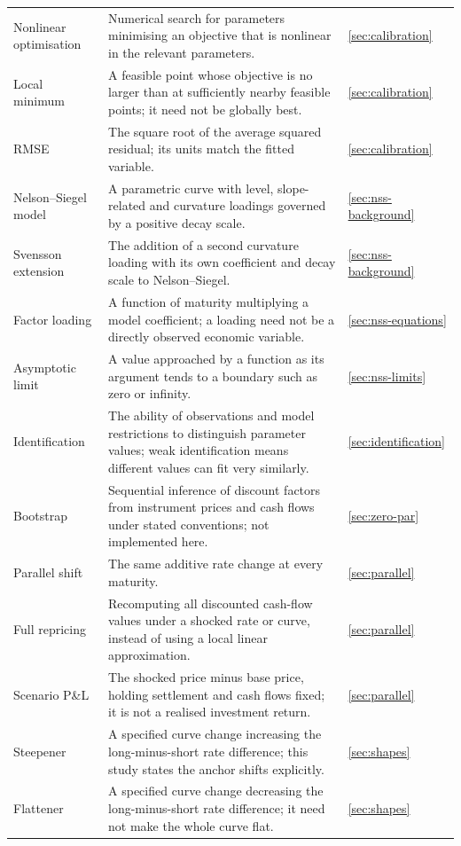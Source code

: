 \begin{longtable}{@{}L{0.22\textwidth}L{0.58\textwidth}L{0.12\textwidth}@{}}
Nonlinear optimisation & Numerical search for parameters minimising an objective that is nonlinear in the relevant parameters. & \ref{sec:calibration}\\
Local minimum & A feasible point whose objective is no larger than at sufficiently nearby feasible points; it need not be globally best. & \ref{sec:calibration}\\
RMSE & The square root of the average squared residual; its units match the fitted variable. & \ref{sec:calibration}\\
Nelson--Siegel model & A parametric curve with level, slope-related and curvature loadings governed by a positive decay scale. & \ref{sec:nss-background}\\
Svensson extension & The addition of a second curvature loading with its own coefficient and decay scale to Nelson--Siegel. & \ref{sec:nss-background}\\
Factor loading & A function of maturity multiplying a model coefficient; a loading need not be a directly observed economic variable. & \ref{sec:nss-equations}\\
Asymptotic limit & A value approached by a function as its argument tends to a boundary such as zero or infinity. & \ref{sec:nss-limits}\\
Identification & The ability of observations and model restrictions to distinguish parameter values; weak identification means different values can fit very similarly. & \ref{sec:identification}\\
Bootstrap & Sequential inference of discount factors from instrument prices and cash flows under stated conventions; not implemented here. & \ref{sec:zero-par}\\
Parallel shift & The same additive rate change at every maturity. & \ref{sec:parallel}\\
Full repricing & Recomputing all discounted cash-flow values under a shocked rate or curve, instead of using a local linear approximation. & \ref{sec:parallel}\\
Scenario P\&L & The shocked price minus base price, holding settlement and cash flows fixed; it is not a realised investment return. & \ref{sec:parallel}\\
Steepener & A specified curve change increasing the long-minus-short rate difference; this study states the anchor shifts explicitly. & \ref{sec:shapes}\\
Flattener & A specified curve change decreasing the long-minus-short rate difference; it need not make the whole curve flat. & \ref{sec:shapes}\\

\end{longtable}
